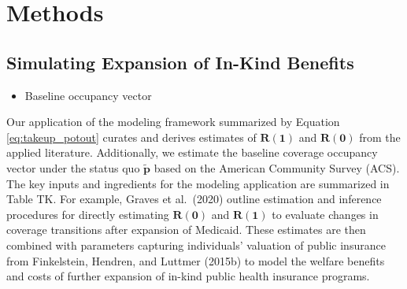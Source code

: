 \documentclass[
  10pt,
]{article}
\providecommand{\tightlist}{%
  \setlength{\itemsep}{0pt}\setlength{\parskip}{0pt}}
\begin{document}
\hypertarget{methods}{%
\section{Methods}\label{methods}}

\hypertarget{simulating-expansion-of-in-kind-benefits}{%
\subsection{Simulating Expansion of In-Kind
Benefits}\label{simulating-expansion-of-in-kind-benefits}}

\begin{itemize}
\tightlist
\item
  Baseline occupancy vector
\end{itemize}

Our application of the modeling framework summarized by Equation
\ref{eq:takeup_potout} curates and derives estimates of
\(\boldsymbol{R(1)}\) and \(\boldsymbol{R(0)}\) from the applied
literature. Additionally, we estimate the baseline coverage occupancy
vector under the status quo \(\boldsymbol{\tilde{p}}\) based on the
American Community Survey (ACS). The key inputs and ingredients for the
modeling application are summarized in Table TK. For example, Graves et
al.~(2020) outline estimation and inference procedures for directly
estimating \(\boldsymbol{R(0)}\) and \(\boldsymbol{R(1)}\) to evaluate
changes in coverage transitions after expansion of Medicaid. These
estimates are then combined with parameters capturing individuals'
valuation of public insurance from Finkelstein, Hendren, and Luttmer
(2015b) to model the welfare benefits and costs of further expansion of
in-kind public health insurance programs.
\end{document}
